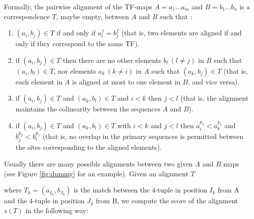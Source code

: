 \clearpage
Formally, the pairwise alignment of the TF-maps $A = a_1 \ldots a_m$ and $B = b_1 \ldots b_n$ is a 
correspondence $T$, maybe empty, between $A$ and $B$ such that \citep{blanco:2006b}:
\begin{enumerate}

\item $(a_i,b_j) \in T$ if and only if $a_i^f = b_j^f$ (that is,
two elements are aligned if and only if they correspond to the same
TF). 

\item if $(a_i,b_j) \in T$ then there are no other elements $b_l~(l \neq j)$ in
$B$ such that $(a_i,b_l) \in T$, nor elements $a_k~(k \neq i)$ in $A$  such that
$(a_k,b_j) \in T$ (that is, each element in $A$ is aligned at most
to one element in $B$, and vice versa).

\item if $(a_i,b_j) \in T$ and $(a_k,b_l) \in T$ and $i<k$ then
$j<l$ (that is, the alignment maintains the colinearity between the
sequences $A$ and $B$).

\item if $(a_i,b_j) \in T$ and $(a_k,b_l) \in T$ with $i<k$ and $j<l$ then
$a_i^{p_2} < a_k^{p_1}$ and $b_j^{p_2} < b_l^{p_1}$ (that is, no overlap
in the primary sequences is permitted between the sites corresponding to the aligned elements).
\end{enumerate}

Usually there are many possible alignments between two given $A$ and
$B$ maps (see Figure \ref{fig:dummy} for an example). Given an alignment $T$

\begin{center}
\end{center}

where $T_k = (a_{I_k},b_{J_k})$ is the match between the 4-tuple in position
${I_k}$ from A and the 4-tuple in position ${J_k}$ from B, we compute
the score of the alignment $s(T)$ in the following way:

\begin{center}
\end{center}


